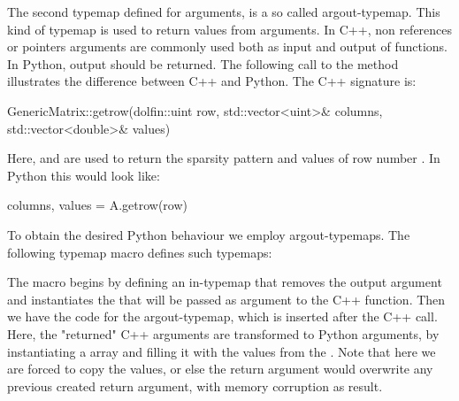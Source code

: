 The second typemap defined for  arguments, is a so called
argout-typemap. This kind of typemap is used to return values from
arguments. In C++, non  references or pointers arguments are
commonly used both as input and output of functions. In Python, output
should be returned. 
The following call to the  method   illustrates
the difference between C++ and Python. The C++ signature is:
\begin{c++}
GenericMatrix::getrow(dolfin::uint row, std::vector<uint>& columns, std::vector<double>& values)
\end{c++}
Here,  and  are used to return the sparsity pattern and values of row number . In Python this would look like:
\begin{python}
columns, values = A.getrow(row)
\end{python}



To obtain the desired Python behaviour we employ 
argout-typemaps. The following typemap macro defines such typemaps:   
The macro begins by defining an in-typemap that removes the output argument
and instantiates the  that will be passed as argument to
the C++ function. Then we have the code for the argout-typemap, which is inserted after the
C++ call. Here, the "returned" C++ arguments are transformed to Python
arguments, by instantiating a \numpy array  and filling it with
the values from the . Note that here we are forced to copy
the values, or else the return argument would overwrite any previous created return argument, with memory corruption as result.


